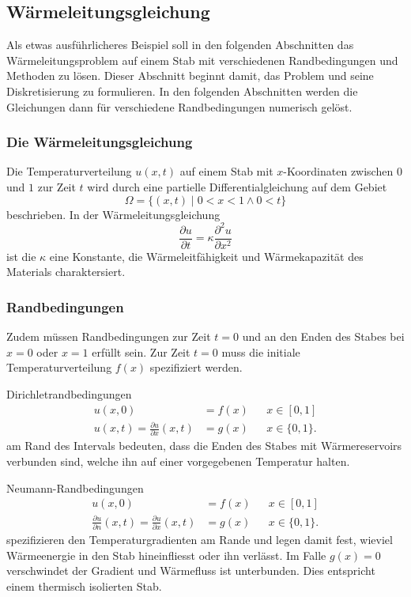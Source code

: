 %
%
%
\subsection{Wärmeleitungsgleichung
\label{buch:subsection:waermeleitung}}
Als etwas ausführlicheres Beispiel soll in den folgenden Abschnitten
das Wärmeleitungsproblem auf einem Stab mit verschiedenen Randbedingungen
und Methoden zu lösen.
Dieser Abschnitt beginnt damit, das Problem und seine Diskretisierung
zu formulieren.
In den folgenden Abschnitten werden die Gleichungen dann für verschiedene
Randbedingungen numerisch gelöst.

\subsubsection{Die Wärmeleitungsgleichung}
Die Temperaturverteilung $u(x,t)$ auf einem Stab mit $x$-Koordinaten
zwischen $0$ und $1$ zur Zeit $t$ wird durch eine partielle
Differentialgleichung auf dem Gebiet
\[
\Omega = \{ (x,t)\;|\; 0 < x < 1\wedge 0<t\}
\]
beschrieben.
In der Wärmeleitungsgleichung
\begin{equation}
\frac{\partial u}{\partial t}
=
\kappa\frac{\partial^2 u}{\partial x^2}
\label{buch:pde:waerme:gleichung}
\end{equation}
ist die $\kappa$ eine Konstante, die Wärmeleitfähigkeit und
Wärmekapazität des Materials charaktersiert.

\subsubsection{Randbedingungen}
Zudem müssen Randbedingungen zur Zeit $t=0$ und an den Enden
des Stabes bei $x=0$ oder $x=1$ erfüllt sein.
Zur Zeit $t=0$ muss die initiale Temperaturverteilung $f(x)$ 
spezifiziert werden.

Dirichletrandbedingungen
\[
\begin{aligned}
u(x,0)&=f(x)&&x\in[0,1]
\\
u(x,t)=\frac{\partial u}{\partial x}(x,t)&=g(x)&&x\in \{0,1\}.
\end{aligned}
\]
am Rand des Intervals bedeuten, dass die Enden des Stabes mit Wärmereservoirs
verbunden sind, welche ihn auf einer vorgegebenen Temperatur halten.

Neumann-Randbedingungen
\[
\begin{aligned}
u(x,0)&=f(x)&&x\in[0,1]
\\
\frac{\partial u}{\partial n}(x,t)=\frac{\partial u}{\partial x}(x,t)&=g(x)&&x\in \{0,1\}.
\end{aligned}
\]
spezifizieren den Temperaturgradienten am Rande und legen damit fest,
wieviel Wärmeenergie in den Stab hineinfliesst oder ihn verlässt.
Im Falle $g(x)=0$ verschwindet der Gradient und Wärmefluss ist unterbunden.
Dies entspricht einem thermisch isolierten Stab.

